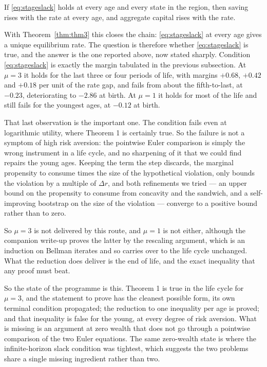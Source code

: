 \begin{theorem}\label{thm:reduction}
If \eqref{eq:stageslack} holds at every age and every state in the region, then saving rises with
the rate at every age, and aggregate capital rises with the rate.
\end{theorem}

With Theorem~\ref{thm:thm3} this closes the chain: \eqref{eq:stageslack} at every age gives a
unique equilibrium rate. The question is therefore whether \eqref{eq:stageslack} is true, and the
answer is the one reported above, now stated sharply. Condition \eqref{eq:stageslack} is exactly
the margin tabulated in the previous subsection. At $\mu=3$ it holds for the last three or four
periods of life, with margins $+0.68$, $+0.42$ and $+0.18$ per unit of the rate gap, and fails
from about the fifth-to-last, at $-0.23$, deteriorating to $-2.86$ at birth. At $\mu=1$ it holds
for most of the life and still fails for the youngest ages, at $-0.12$ at birth.

That last observation is the important one. The condition fails even at logarithmic utility,
where Theorem 1 is certainly true. So the failure is not a symptom of high risk aversion: the
pointwise Euler comparison is simply the wrong instrument in a life cycle, and no sharpening of
it that we could find repairs the young ages. Keeping the term the step discards, the marginal
propensity to consume times the size of the hypothetical violation, only bounds the violation by
a multiple of $\Delta r$, and both refinements we tried --- an upper bound on the propensity to
consume from concavity and the sandwich, and a self-improving bootstrap on the size of the
violation --- converge to a positive bound rather than to zero.

So $\mu=3$ is not delivered by this route, and $\mu=1$ is not either, although the companion
write-up proves the latter by the rescaling argument, which is an induction on Bellman iterates
and so carries over to the life cycle unchanged. What the reduction does deliver is the end of
life, and the exact inequality that any proof must beat.

So the state of the programme is this. Theorem 1 is true in the life cycle for $\mu=3$, and the
statement to prove has the cleanest possible form, its own terminal condition propagated; the
reduction to one inequality per age is proved; and that inequality is false for the young, at
every degree of risk aversion. What is missing is an argument at zero wealth that does not go
through a pointwise comparison of the two Euler equations. The same zero-wealth state is where the
infinite-horizon slack condition was tightest, which suggests the two problems share a single
missing ingredient rather than two.

